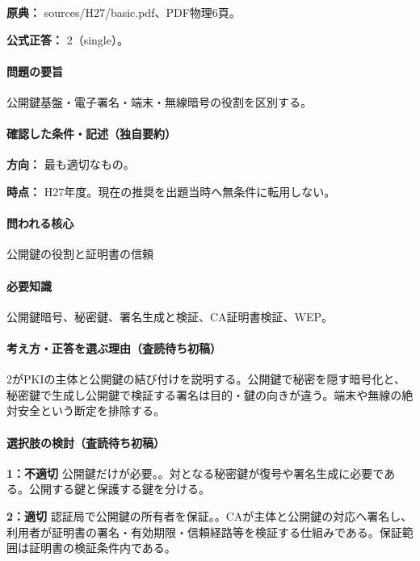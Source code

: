 \noindent\textbf{原典：} sources/H27/basic.pdf、PDF物理6頁。

\textbf{公式正答：} 2（single）。

\paragraph{問題の要旨} 公開鍵基盤・電子署名・端末・無線暗号の役割を区別する。

\paragraph{確認した条件・記述（独自要約）}\mbox{}\par

\noindent\textbf{方向：} 最も適切なもの。\par

\noindent\textbf{時点：} H27年度。現在の推奨を出題当時へ無条件に転用しない。\par

\paragraph{問われる核心} 公開鍵の役割と証明書の信頼

\paragraph{必要知識} 公開鍵暗号、秘密鍵、署名生成と検証、CA証明書検証、WEP。

\paragraph{考え方・正答を選ぶ理由（査読待ち初稿）} 2がPKIの主体と公開鍵の結び付けを説明する。公開鍵で秘密を隠す暗号化と、秘密鍵で生成し公開鍵で検証する署名は目的・鍵の向きが違う。端末や無線の絶対安全という断定を排除する。

\paragraph{選択肢の検討（査読待ち初稿）}\mbox{}\par

\noindent\textbf{1：不適切} 公開鍵だけが必要。。対となる秘密鍵が復号や署名生成に必要である。公開する鍵と保護する鍵を分ける。\par

\noindent\textbf{2：適切} 認証局で公開鍵の所有者を保証。。CAが主体と公開鍵の対応へ署名し、利用者が証明書の署名・有効期限・信頼経路等を検証する仕組みである。保証範囲は証明書の検証条件内である。\par


